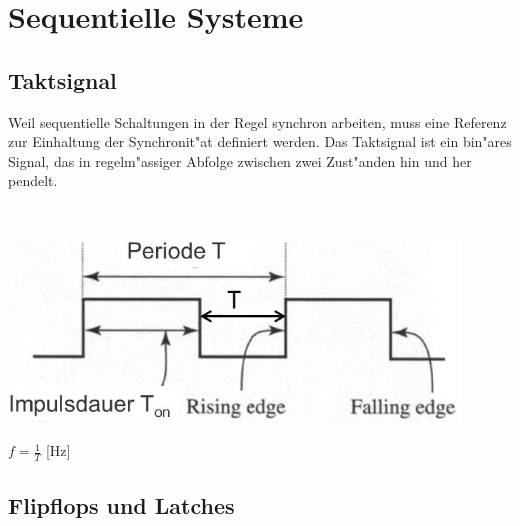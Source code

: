 \section{Sequentielle Systeme}

\subsection{Taktsignal}
	\begin{minipage}{8 cm}
		Weil sequentielle Schaltungen in der Regel synchron arbeiten, muss eine Referenz zur Einhaltung der Synchronit"at definiert werden. Das Taktsignal ist ein bin"ares Signal, das in regelm"assiger Abfolge zwischen zwei Zust"anden hin und her pendelt.
	\end{minipage}
	\begin{minipage}{0.5 cm}
		\ 
	\end{minipage}
	\begin{minipage}{7 cm}
		\includegraphics[width=0.9\textwidth]{pics/taktsignal}
	\end{minipage}
	\begin{minipage}{2 cm}
		$f=\frac{1}{T}$ [Hz]
	\end{minipage}

\subsection{Flipflops und Latches}
